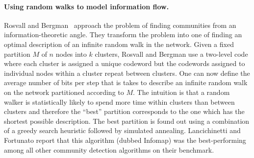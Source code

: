 \paragraph{Using random walks to model information flow.} Rosvall and Bergman~\cite{RB08} approach the 
problem of finding communities from an information-theoretic angle. They transform the problem 
into one of finding an optimal description of an infinite random walk in the network.  Given a fixed 
partition $M$ of $n$ nodes into $k$ clusters, Rosvall and Bergman use a two-level code where each 
cluster is assigned a unique codeword but the codewords assigned to individual nodes within a 
cluster repeat between clusters. One can now define the average number of bits per step that is 
takes to describe an infinite random walk on the network partitioned according to $M$. The intuition 
is that a random walker is statistically likely to spend more time within clusters than between clusters
and therefore the ``best'' partition corresponds to the one which has the shortest possible description.
The best partition is found out using a combination of a greedy search heuristic followed by simulated 
annealing. Lancichinetti and Fortunato report that this algorithm (dubbed Infomap) was the best-performing 
among all other community detection algorithms on their benchmark.  
